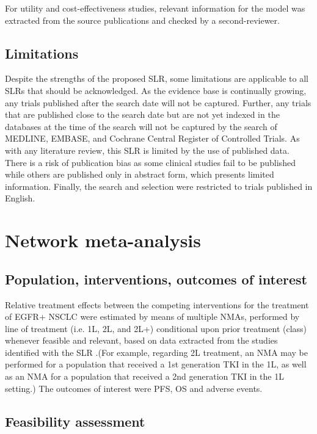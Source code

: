 \documentclass[11pt,final,fleqn]{article}\usepackage[]{graphicx}\usepackage[]{color}
\theoremstyle{plain}
\begin{document}
{\begin{appendices}
For utility and cost-effectiveness studies, relevant information for the model was extracted from the source publications and checked by a second-reviewer. 

\subsection{Limitations}

Despite the strengths of the proposed SLR, some limitations are applicable to all SLRs that should be acknowledged. As the evidence base is continually growing, any trials published after the search date will not be captured. Further, any trials that are published close to the search date but are not yet indexed in the databases at the time of the search will not be captured by the search of MEDLINE, EMBASE, and Cochrane Central Register of Controlled Trials. As with any literature review, this SLR is limited by the use of published data. There is a risk of publication bias as some clinical studies fail to be published while others are published only in abstract form, which presents limited information. Finally, the search and selection were restricted to trials published in English.

\section{Network meta-analysis}

\subsection{Population, interventions, outcomes of interest}

Relative treatment effects between the competing interventions for the treatment of EGFR+ NSCLC were estimated by means of multiple NMAs, performed by line of treatment (i.e. 1L, 2L, and 2L+) conditional upon prior treatment (class) whenever feasible and relevant, based on data extracted from the studies identified with the SLR \citep{jansen2014indirect, dias2018network}.(For example, regarding 2L treatment, an NMA may be performed for a population that received a 1st generation TKI in the 1L, as well as an NMA for a population that received a 2nd generation TKI in the 1L setting.) The outcomes of interest were PFS, OS and adverse events.

\subsection{Feasibility assessment}


\end{appendices}}
\end{document}

